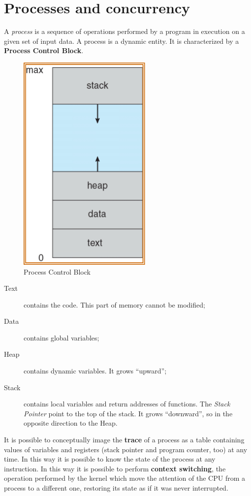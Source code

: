 \chapter{Processes and concurrency}
A \emph{process} is a sequence of operations performed by a program in execution on a given set of input data. A process is a dynamic entity. It is characterized by a \textbf{Process Control Block}.

\begin{figure}[hbtp]
\centering
\includegraphics[scale=0.3]{images/processes_concurrency/pcb.jpg}
\caption{Process Control Block}
\end{figure}
\begin{description}
\item [Text] contains the code. This part of memory cannot be modified;
\item [Data] contains global variables;
\item [Heap] contains dynamic variables. It grows ``upward'';
\item [Stack] contains local variables and return addresses of functions. The \emph{Stack Pointer} point to the top of the stack. It grows ``downward'', so in the opposite direction to the Heap.
\end{description}

It is possible to conceptually image the \textbf{trace} of a process as a table containing values of variables and registers (stack pointer and program counter, too) at any time. In this way it is possible to know the state of the process at any instruction. In this way it is possible to perform \textbf{context switching}, the operation performed by the kernel which move the attention of the CPU from a process to a different one, restoring its state as if it was never interrupted.

